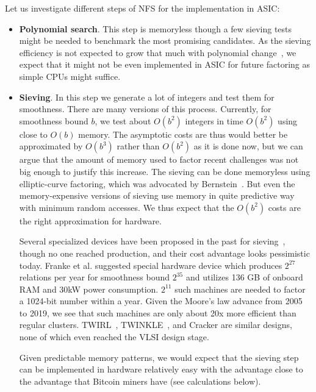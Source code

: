 \documentclass[a4paper]{article}
\begin{document}
 Let us investigate different steps of NFS for the implementation in ASIC:
 \begin{itemize}
    \item \textbf{Polynomial search}.  This step is memoryless though a few sieving tests might be needed to benchmark the most promising candidates. As the sieving efficiency is not expected to grow that much with polynomial change~\cite{kleinjung2006polynomial}, we expect that it might not be even implemented in ASIC for future factoring as simple CPUs might suffice.
 
     \item \textbf{Sieving}. In this step we generate a lot of integers and test them for smoothness.  There are many versions of this process. Currently, for smoothness bound $b$, we test about $O(b^2)$ integers in time $O(b^2)$ using close to $O(b)$ memory. The asymptotic costs are thus would better be approximated by $O(b^3)$ rather than $O(b^2)$ as it is done now, but we can argue that the amount of memory used to factor recent challenges was not big enough to justify this increase. The sieving  can be done memoryless using elliptic-curve factoring, which was advocated by Bernstein~\cite{bernstein01}. But even
     the memory-expensive versions of sieving use memory in quite predictive way with minimum random accesses. We thus expect that the $O(b^2)$ costs are the right approximation for hardware.
     
     Several specialized devices have been proposed in the past for sieving~\cite{DBLP:conf/ches/Shamir99,pelzl2005area,bachimanchi2007fpga,izu2007cairn}, though no one reached production, and their cost advantage looks pessimistic today. Franke et al. suggested \cite{DBLP:conf/ches/FrankeKPPPS05} special hardware device which produces $2^{27}$ relations per year for smoothness bound $2^{35}$ and utilizes 136 GB of onboard RAM and 30kW power consumption. $2^{11}$ such machines are needed to factor a 1024-bit number within a year. Given the Moore's law advance from 2005 to 2019, we see that such machines are only about 20x more efficient than regular clusters. TWIRL~\cite{shamir2003factoring}, TWINKLE~\cite{DBLP:conf/ches/Shamir99}, and Cracker are similar designs, none of which even reached the VLSI design stage.
     
     Given predictable memory patterns, we would expect that the sieving step can be implemented in hardware relatively easy with the advantage close to the advantage that Bitcoin miners have (see calculations below).
     

\end{itemize}
\end{document}

